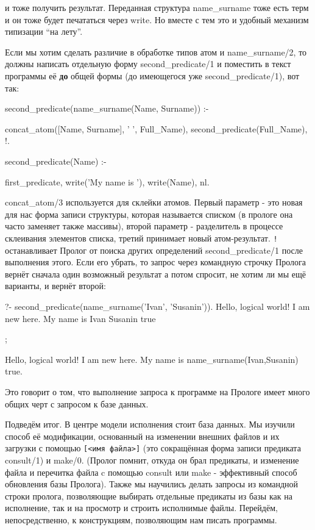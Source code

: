 \documentclass[a4paper]{book}
\begin{document}
и тоже получить результат. Переданная структура name_surname тоже
есть терм и он тоже будет печататься через write. Но вместе с тем
это и удобный механизм типизации ``на лету''.

Если мы хотим сделать различие в обработке типов атом и
name_surname/2, то должны написать отдельную форму
second_predicate/1 и поместить в текст программы её {\bf до}
общей формы (до имеющегося уже second_predicate/1), вот так:

\begin{example}{}{}
second_predicate(name_surname(Name, Surname)) :-

   concat_atom([Name, Surname], ' ', Full_Name),
   second_predicate(Full_Name), !.

second_predicate(Name) :-

  first_predicate,
  write('My name is '), write(Name), nl.

\end{example}

concat_atom/3 используется для склейки атомов. Первый параметр -
это новая для нас форма записи структуры, которая называется
списком (в прологе она часто заменяет также массивы), второй
параметр - разделитель в процессе склеивания элементов списка,
третий принимает новый атом-результат. \verb|!| останавливает
Пролог от поиска других определений second_predicate/1 после
выполнения этого. Если его убрать, то запрос через командную
строчку Пролога вернёт сначала один возможный результат а потом
спросит, не хотим ли мы ещё варианты, и вернёт второй:

\begin{example}{}{}
?- second_predicate(name_surname('Ivan', 'Susanin')).
Hello, logical world!
I am new here.
My name is Ivan Susanin
true 


; %

Hello, logical world!
I am new here.
My name is name_surname(Ivan,Susanin)
true.
\end{example}

Это говорит о том, что выполнение запроса к программе на Прологе
имеет много общих черт с запросом к базе данных.

Подведём итог. В центре модели исполнения стоит база данных. Мы
изучили способ её модификации, основанный на изменении внешних
файлов и их загрузки с помощью \verb|[<имя файла>]| (это
сокращённая форма записи предиката consult/1) и make/0. (Пролог
помнит, откуда он брал предикаты, и изменение файла и перечитка
файла c помощью consult или make - эффективный способ обновления
базы Пролога). Также мы научились делать запросы из командной
строки пролога, позволяющие выбирать отдельные предикаты из базы
как на исполнение, так и на просмотр и строить исполнимые
файлы. Перейдём, непосредственно, к конструкциям, позволяющим нам
писать программы.
\end{document}
